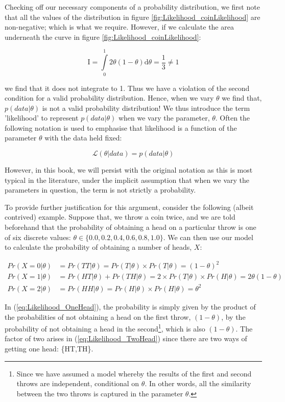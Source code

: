 \documentclass[11pt,fullpage]{book}
\begin{document}
Checking off our necessary components of a probability distribution, we first note that all the values of the distribution in figure \ref{fig:Likelihood_coinLikelihood} are non-negative; which is what we require. However, if we calculate the area underneath the curve in figure \ref{fig:Likelihood_coinLikelihood}:

\begin{equation}
\mathrm{I} = \int\limits_{0}^{1} 2\theta(1-\theta)\mathrm{d}\theta = \frac{1}{3} \neq 1
\end{equation}

we find that it does not integrate to 1. Thus we have a violation of the second condition for a valid probability distribution. Hence, when we vary $\theta$ we find that, $p(data|\theta)$ is not a valid probability distribution! We thus introduce the term 'likelihood' to represent $p(data|\theta)$ when we vary the parameter, $\theta$. Often the following notation is used to emphasise that likelihood is a function of the parameter $\theta$ with the data held fixed:

\begin{equation}\label{eq:Likelihood_notation}
\mathcal{L}(\theta|data) = p(data|\theta)
\end{equation}

However, in this book, we will persist with the original notation as this is most typical in the literature, under the implicit assumption that when we vary the parameters in question, the term is not strictly a probability.

To provide further justification for this argument, consider the following (albeit contrived) example. Suppose that, we throw a coin twice, and we are told beforehand that the probability of obtaining a head on a particular throw is one of six discrete values: $\theta\in\{0.0,0.2,0.4,0.6,0.8,1.0\}$. We can then use our model to calculate the probability of obtaining a number of heads, $X$:

\begin{align}\label{eq:Likelihood_OneHead}
Pr(X = 0|\theta)& = Pr(TT|\theta) = Pr(T|\theta)\times Pr(T|\theta) = (1-\theta)^2\\
Pr(X = 1|\theta)& = Pr(HT|\theta) + Pr(TH|\theta) = 2\times Pr(T|\theta)\times Pr(H|\theta) = 2\theta(1-\theta)\\\label{eq:Likelihood_TwoHead}
Pr(X = 2|\theta)& = Pr(HH|\theta) = Pr(H|\theta)\times Pr(H|\theta) = \theta^2
\end{align}

In (\ref{eq:Likelihood_OneHead}), the probability is simply given by the product of the probabilities of not obtaining a head on the first throw, $(1-\theta)$, by the probability of not obtaining a head in the second\footnote{Since we have assumed a model whereby the results of the first and second throws are independent, conditional on $\theta$. In other words, all the similarity between the two throws is captured in the parameter $\theta$.}, which is also $(1-\theta)$. The factor of two arises in (\ref{eq:Likelihood_TwoHead}) since there are two ways of getting one head: \{HT,TH\}.
\end{document}

